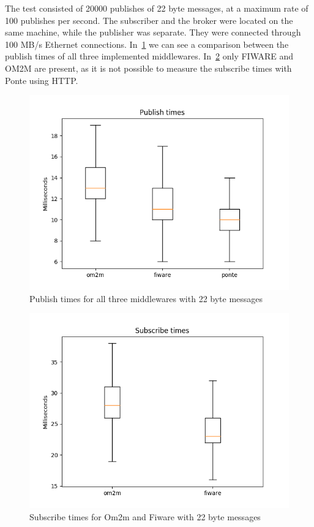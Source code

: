 \documentclass[conference]{IEEEtran}
\begin{document}
The test consisted of 20000 publishes of 22 byte messages, at a maximum rate of 100 publishes per second. The subscriber and the broker were located on the same machine, while the publisher was separate. They were connected through 100 MB/s Ethernet connections. In~\ref{fig:publish_times} we can see a comparison between the publish times of all three implemented middlewares. In~\ref{fig:subscribe_times} only FIWARE and OM2M are present, as it is not possible to measure the subscribe times with Ponte using HTTP. 

\begin{figure}[htbp!]
  \centering
  \includegraphics[width=\columnwidth]{figures/om2m_fiware_ponte_publish_times.png}
  \caption{Publish times for all three middlewares with 22 byte messages}
  \label{fig:publish_times}
\end{figure}

\begin{figure}[htbp!]
  \centering
  \includegraphics[width=\columnwidth]{figures/om2m_fiware_subscribe_times.png}
  \caption{Subscribe times for Om2m and Fiware with 22 byte messages}
  \label{fig:subscribe_times}
\end{figure}
\end{document}
